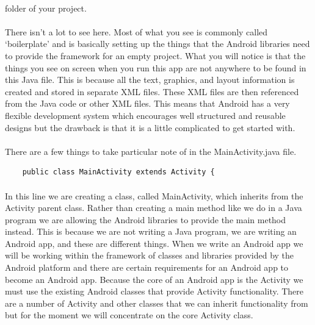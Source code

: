 \paragraph{} folder of your project. 

\paragraph{} There isn’t a lot to see here. Most of what you see is commonly called `boilerplate' and is basically setting up the things that the Android libraries need to provide the framework for an empty project. What you will notice is that the things you see on screen when you run this app are not anywhere to be found in this Java file. This is because all the text, graphics, and layout information is created and stored in separate XML files. These XML files are then referenced from the Java code or other XML files. This means that Android has a very flexible development system which encourages well structured and reusable designs but the drawback is that it is a little complicated to get started with.

\paragraph{} There are a few things to take particular note of in the MainActivity.java file.

\begin{lstlisting}
    public class MainActivity extends Activity {
\end{lstlisting}

\paragraph{} In this line we are creating a class, called MainActivity, which inherits from the Activity parent class. Rather than creating a main method like we do in a Java program we are allowing the Android libraries to provide the main method instead. This is because we are not writing a Java program, we are writing an Android app, and these are different things. When we write an Android app we will be working within the framework of classes and libraries provided by the Android platform and there are certain requirements for an Android app to become an Android app. Because the core of an Android app is the Activity we must use the existing Android classes that provide Activity functionality. There are a number of Activity and other classes that we can inherit functionality from but for the moment we will concentrate on the core Activity class.


